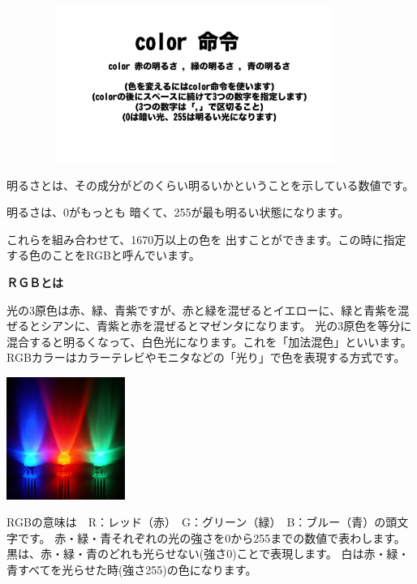\documentclass[a4paper,12pt]{jarticle}
\begin{document}
\begin{minipage}{9.781cm}
\centering
{\upshape
\includegraphics[keepaspectratio,width=12.277cm,height=5.08cm]{text02-img/text02-img030.png}}
\end{minipage}

\bigskip
\bigskip
\bigskip

明るさとは、その成分がどのくらい明るいかということを示している数値です。

明るさは、0がもっとも
暗くて、255が最も明るい状態になります。

これらを組み合わせて、1670万以上の色を
出すことができます。この時に指定する色のことをRGBと呼んでいます。

\bigskip
\bigskip

{\bfseries
ＲＧＢとは}

光の3原色は赤、緑、青紫ですが、赤と緑を混ぜるとイエローに、緑と青紫を混ぜるとシアンに、青紫と赤を混ぜるとマゼンタになります。
光の3原色を等分に混合すると明るくなって、白色光になります。これを「加法混色」といいます。
RGBカラーはカラーテレビやモニタなどの「光り」で色を表現する方式です。

\bigskip
\bigskip

\begin{minipage}{9.781cm}
\centering
{\upshape
\includegraphics[keepaspectratio,width=3.854cm,height=3.988cm]{text02-img/text02-img033.jpg}}
\end{minipage}

\bigskip
\bigskip
\bigskip

RGBの意味は　R：レッド（赤）　G：グリーン（緑）　B：ブルー（青）の頭文字です。
赤・緑・青それぞれの光の強さを0から255までの数値で表わします。
黒は、赤・緑・青のどれも光らせない(強さ0)ことで表現します。
白は赤・緑・青すべてを光らせた時(強さ255)の色になります。
\end{document}
